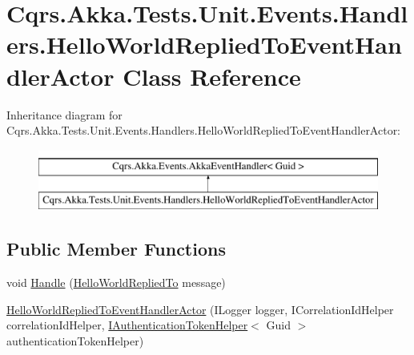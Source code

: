 \hypertarget{classCqrs_1_1Akka_1_1Tests_1_1Unit_1_1Events_1_1Handlers_1_1HelloWorldRepliedToEventHandlerActor}{}\section{Cqrs.\+Akka.\+Tests.\+Unit.\+Events.\+Handlers.\+Hello\+World\+Replied\+To\+Event\+Handler\+Actor Class Reference}
\label{classCqrs_1_1Akka_1_1Tests_1_1Unit_1_1Events_1_1Handlers_1_1HelloWorldRepliedToEventHandlerActor}
Inheritance diagram for Cqrs.\+Akka.\+Tests.\+Unit.\+Events.\+Handlers.\+Hello\+World\+Replied\+To\+Event\+Handler\+Actor\+:\begin{figure}[H]
\begin{center}
\leavevmode
\includegraphics[height=2.000000cm]{classCqrs_1_1Akka_1_1Tests_1_1Unit_1_1Events_1_1Handlers_1_1HelloWorldRepliedToEventHandlerActor}
\end{center}
\end{figure}
\subsection*{Public Member Functions}
\begin{DoxyCompactItemize}
\item 
void \hyperlink{classCqrs_1_1Akka_1_1Tests_1_1Unit_1_1Events_1_1Handlers_1_1HelloWorldRepliedToEventHandlerActor_a9d843860260cd66f8354b9df234a1663_a9d843860260cd66f8354b9df234a1663}{Handle} (\hyperlink{classCqrs_1_1Akka_1_1Tests_1_1Unit_1_1Events_1_1HelloWorldRepliedTo}{Hello\+World\+Replied\+To} message)
\item 
\hyperlink{classCqrs_1_1Akka_1_1Tests_1_1Unit_1_1Events_1_1Handlers_1_1HelloWorldRepliedToEventHandlerActor_a174cd0183fbe16aaa74f18320e871a5f_a174cd0183fbe16aaa74f18320e871a5f}{Hello\+World\+Replied\+To\+Event\+Handler\+Actor} (I\+Logger logger, I\+Correlation\+Id\+Helper correlation\+Id\+Helper, \hyperlink{interfaceCqrs_1_1Authentication_1_1IAuthenticationTokenHelper}{I\+Authentication\+Token\+Helper}$<$ Guid $>$ authentication\+Token\+Helper)
\end{DoxyCompactItemize}
